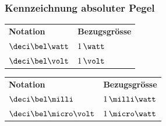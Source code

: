 \subsubsection{Kennzeichnung absoluter Pegel}

\begin{center}
    \begin{tabular}{ll}
        \textbf{Notation}       & \textbf{Bezugsgrösse} \\
        $\deci\bel\watt$        & $1 \, \watt$          \\
        $\deci\bel\volt$        & $1 \, \volt$          \\
    \end{tabular}\hspace{5mm}
    \begin{tabular}{ll}
        \textbf{Notation}       & \textbf{Bezugsgrösse} \\
        $\deci\bel\milli$       & $1 \, \milli \watt$ \\
        $\deci\bel\micro\volt$  & $1 \, \micro \watt$ 
    \end{tabular}
\end{center}
